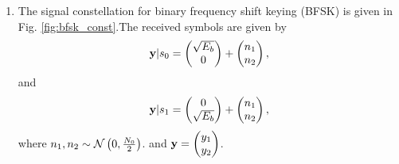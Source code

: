\documentclass[10pt, a4paper]{article}
\begin{document}
\begin{enumerate}
\item
The signal constellation for binary frequency shift keying (BFSK) is given in Fig. \ref{fig:bfsk_const}.The received symbols are given by 
\begin{align}
\mathbf{y}|s_0 = 
\begin{pmatrix}
\sqrt{E_b} \\
0
\end{pmatrix}
+
\begin{pmatrix}
 n_{1}\\
n_{2}
\end{pmatrix},
\end{align}
and 
\begin{align}
\mathbf{y}|s_1 = 
\begin{pmatrix}
0\\
\sqrt{E_b} 
\end{pmatrix}
+
\begin{pmatrix}
n_{1}\\
 n_{2}
\end{pmatrix},
\end{align}
where $n_1,n_2 \sim \mathcal{N}\left(0,\frac{N_0}{2}\right)$. and
$
\mathbf{y} = 
\begin{pmatrix}
y_{1}\\
 y_{2}
\end{pmatrix}
$.


\end{enumerate}
\end{document}
